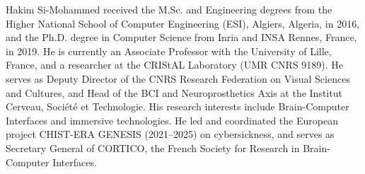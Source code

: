 \documentclass[lettersize,journal]{IEEEtran}
\begin{document}
\begin{IEEEbiographynophoto}{Hakim Si-Mohammed}
received the M.Sc. and Engineering degrees from the Higher National School of Computer Engineering (ESI), Algiers, Algeria, in 2016, and the Ph.D. degree in Computer Science from Inria and INSA Rennes, France, in 2019. He is currently an Associate Professor with the University of Lille, France, and a researcher at the CRIStAL Laboratory (UMR CNRS 9189). He serves as Deputy Director of the CNRS Research Federation on Visual Sciences and Cultures, and Head of the BCI and Neuroprosthetics Axis at the Institut Cerveau, Soci\'et\'e et Technologie. His research interests include Brain-Computer Interfaces and immersive technologies. He led and coordinated the European project CHIST-ERA GENESIS (2021--2025) on cybersickness, and serves as Secretary General of CORTICO, the French Society for Research in Brain-Computer Interfaces.
\end{IEEEbiographynophoto}

\vfill
\end{document}
